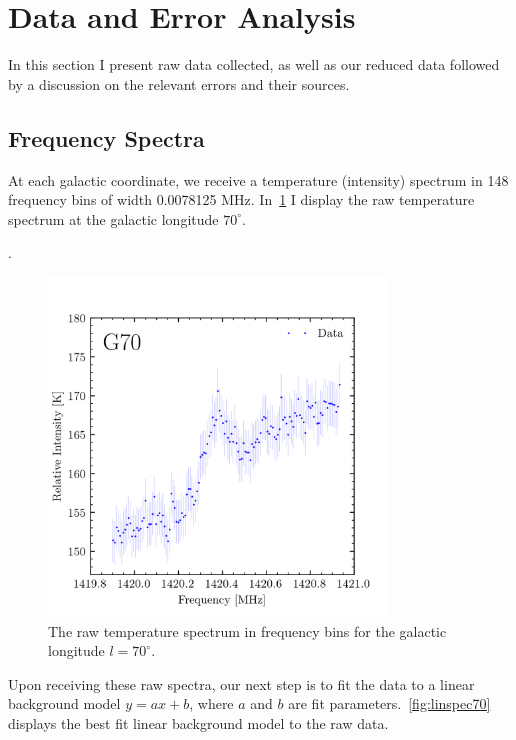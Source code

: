 \documentclass[aps,twocolumn,secnumarabic,balancelastpage,amsmath,amssymb,nofootinbib, floatfix]{revtex4-2}
\begin{document}
	\section{Data and Error Analysis}
	
	
	In this section I present raw data collected, as well as our reduced data followed by a discussion on the relevant errors and their sources. 
	
	\subsection{Frequency Spectra}
	At each galactic coordinate, we receive a temperature (intensity) spectrum in 148 frequency bins of width 0.0078125 MHz. In~\ref{fig:rawspec70} I display the raw temperature spectrum at the galactic longitude $70^{\circ}$.
	 
. 	\begin{figure}[h]
		\centering
		\includegraphics[width=9cm]{spec_linraw_70.png}
		\caption{The raw temperature spectrum in frequency bins for the galactic longitude $l=70^{\circ}$.}
		\label{fig:rawspec70}
	\end{figure}
	
	Upon receiving these raw spectra, our next step is to fit the data to a linear background model $y=ax+b$, where $a$ and $b$ are fit parameters.~\ref{fig:linspec70} displays the best fit linear background model to the raw data.
	
\end{document}
